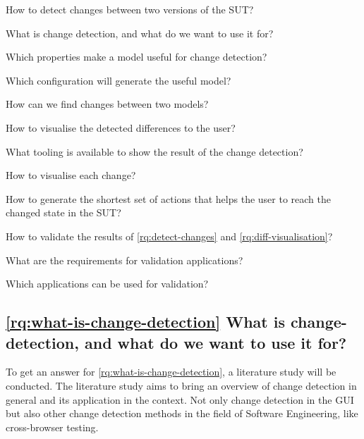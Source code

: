 \begin{questions}
    \item How to detect changes between two versions of the SUT? \label{rq:detect-changes}
    \begin{questions}
        \item What is change detection, and what do we want to use it for? \label{rq:what-is-change-detection}
        \item Which properties make a model useful for change detection? \label{rq:useful-detection}
        \item Which \testar configuration will generate the useful model? \label{rq:testar-config}
        \item How can we find changes between two models? \label{rq:finding-changes}
    \end{questions}

    \item How to visualise the detected differences to the user? \label{rq:diff-visualisation}
    \begin{questions}
        \item What tooling is available to show the result of the change detection? \label{rq:tooling}
        \item How to visualise each change? \label{rq:type-visualisation}
        \item How to generate the shortest set of actions that helps the user to reach the changed state in the SUT? \label{rq:shortest-set}    
    \end{questions}
    
    \item How to validate the results of \ref{rq:detect-changes} and \ref{rq:diff-visualisation}? \label{rq:validation}
    \begin{questions}
        \item What are the requirements for validation applications? \label{rq:req-apps}
        \item Which applications can be used for validation? \label{rq:validation-apps}
    \end{questions}
\end{questions}

\subsection{\ref{rq:what-is-change-detection} What is change-detection, and what do we want to use it for?}
To get an answer for \ref{rq:what-is-change-detection}, a literature study will be conducted. The literature study aims to bring an overview of change detection in general and its application in the \testar context. Not only change detection in the GUI but also other change detection methods in the field of Software Engineering, like cross-browser testing. 

